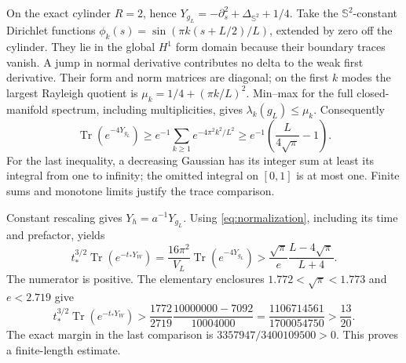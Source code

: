 \documentclass[10pt]{article}
\newcommand{\Tr}{\operatorname{Tr}}
\newcommand{\Sph}{\mathbb S}
\begin{document}
On the exact cylinder \(R=2\), hence
\(Y_{g_L}=-\partial_s^2+\Delta_{\Sph^2}+1/4\).
Take the \(\Sph^2\)-constant Dirichlet functions
\(\phi_k(s)=\sin(\pi k(s+L/2)/L)\), extended by zero off the cylinder.
They lie in the global \(H^1\) form domain because their boundary traces
vanish. A jump in normal derivative contributes no delta to the weak
first derivative. Their form and norm matrices are diagonal; on the
first \(k\) modes the largest Rayleigh quotient is
\(\mu_k=1/4+(\pi k/L)^2\).
Min--max for the full closed-manifold spectrum, including multiplicities,
gives \(\lambda_k(g_L)\leq\mu_k\). Consequently
\[
 \Tr(e^{-4Y_{g_L}})\geq e^{-1}\sum_{k\geq1}e^{-4\pi^2k^2/L^2}
 \geq e^{-1}\left(\frac{L}{4\sqrt\pi}-1\right).
\tag{3}\label{eq:trace}
\]
For the last inequality, a decreasing Gaussian has its integer sum at
least its integral from one to infinity; the omitted integral on \([0,1]\)
is at most one. Finite sums and monotone limits justify the trace comparison.

Constant rescaling gives \(Y_h=a^{-1}Y_{g_L}\).
Using \eqref{eq:normalization}, including its time and prefactor, yields
\[
 t_*^{3/2}\Tr(e^{-t_*Y_W})
 =\frac{16\pi^2}{V_L}\Tr(e^{-4Y_{g_L}})
 >\frac{\sqrt\pi}{e}\frac{L-4\sqrt\pi}{L+4}.
\]
The numerator is positive. The elementary enclosures
\(1.772<\sqrt\pi<1.773\) and \(e<2.719\) give
\[
 t_*^{3/2}\Tr(e^{-t_*Y_W})
 >\frac{1772}{2719}\frac{10000000-7092}{10004000}
 =\frac{1106714561}{1700054750}>\frac{13}{20}.
\tag{4}\label{eq:lower}
\]
The exact margin in the last comparison is
\(3357947/3400109500>0\). This proves a finite-length estimate.
\end{document}
